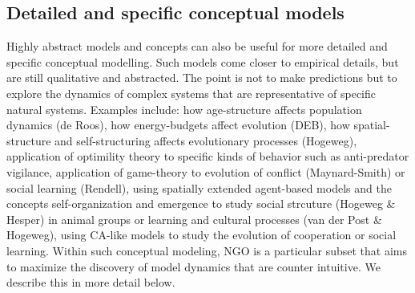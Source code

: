 \subsection{Detailed and specific conceptual models}

Highly abstract models and concepts can also be useful for more detailed and specific conceptual modelling. Such models come closer to empirical details, but are still qualitative and abstracted. The point is not to make predictions but to explore the dynamics of complex systems that are representative of specific natural systems. Examples include: how age-structure affects population dynamics (de Roos), how energy-budgets affect evolution (DEB), how spatial-structure and self-structuring affects evolutionary processes (Hogeweg), application of optimility theory to specific kinds of behavior such as anti-predator vigilance, application of game-theory to evolution of conflict (Maynard-Smith) or social learning (Rendell), using spatially extended agent-based models and the concepts self-organization and emergence to study social strcuture (Hogeweg & Hesper) in animal groups or learning and cultural processes (van der Post & Hogeweg), using CA-like models to study the evolution of cooperation or social learning.
Within such conceptual modeling, NGO is a particular subset that aims to maximize the discovery of model dynamics that are counter intuitive. We describe this in more detail below.
  